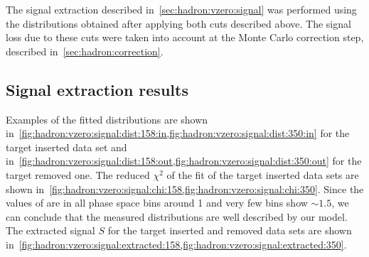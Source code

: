 The signal extraction described in~\cref{sec:hadron:vzero:signal}
was performed using the \minv distributions obtained
after applying both \vzero cuts described above.
The signal loss due to these cuts were taken into account
at the Monte Carlo correction step, described in~\cref{sec:hadron:correction}.

\subsection{Signal extraction results}
\label{sec:hadron:vzero:results}

Examples of the fitted \minv distributions are shown
in~\cref{fig:hadron:vzero:signal:dist:158:in,fig:hadron:vzero:signal:dist:350:in}
for the target inserted data set and
in~\cref{fig:hadron:vzero:signal:dist:158:out,fig:hadron:vzero:signal:dist:350:out}
for the target removed one.
The reduced $\chi^2$ of the \minv fit of the target inserted data sets are shown
in~\cref{fig:hadron:vzero:signal:chi:158,fig:hadron:vzero:signal:chi:350}.
Since the values of \redchisq are in all phase space bins around 1
and very few bins show \redchisq $\sim 1.5$, we can conclude that the
measured \minv distributions are well described by our \minv model.   
The extracted signal $S$ for the target inserted and removed data sets are shown
in~\cref{fig:hadron:vzero:signal:extracted:158,fig:hadron:vzero:signal:extracted:350}.


